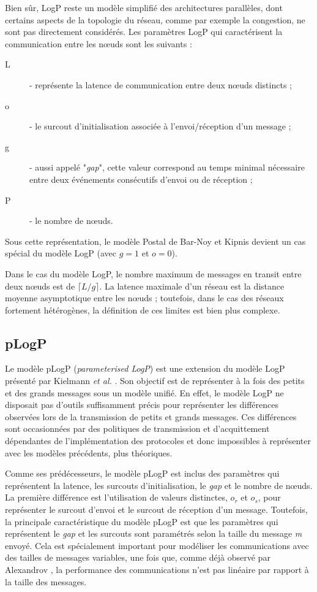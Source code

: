 Bien sûr, LogP reste un modèle simplifié des architectures parallèles,
dont certains aspects de la topologie du réseau, comme par exemple
la congestion, ne sont pas directement considérés. Les paramètres LogP qui caractérisent
la communication entre les n{\oe}uds sont les suivants : 

\begin{description}
\item [{L}] - représente la latence de communication entre deux n{\oe}uds
distincts ;
\item [{o}] - le surcout d'initialisation associée à l'envoi/réception
d'un message ;
\item [{g}] - aussi appelé "\textit{gap}", cette valeur correspond au temps minimal nécessaire entre deux événements consécutifs
d'envoi ou de réception ;
\item [{P}] - le nombre de n{\oe}uds.
\end{description}
Sous cette représentation, le modèle Postal de Bar-Noy et Kipnis devient
un cas spécial du modèle LogP (avec $g=1$ et $o=0$). 

Dans le cas du modèle LogP, le nombre maximum de messages en transit
entre deux n{\oe}uds est de $\lceil L/g\rceil$. La latence maximale
d'un réseau est la distance moyenne asymptotique entre les n{\oe}uds
; toutefois, dans le cas des réseaux fortement hétérogènes, la définition
de ces limites est bien plus complexe. 


\subsection*{pLogP}

Le modèle pLogP (\emph{parameterised LogP}) est une extension
du modèle LogP présenté par Kielmann \emph{et al.} \cite{Kielmann01}. Son objectif est de 
représenter à la fois des petits et des grands messages sous un modèle unifié. En effet, le modèle LogP ne disposait pas d'outils suffisamment précis pour représenter les différences observées lors de la transmission de petits et grands messages. Ces différences sont occasionnées par des politiques de transmission et d'acquittement dépendantes de l'implémentation des protocoles et donc impossibles à représenter avec les modèles précédents, plus théoriques.

Comme ses prédécesseurs, le modèle pLogP est inclus des
paramètres qui représentent la latence, les surcouts d'initialisation,
le \emph{gap} et le nombre de n{\oe}uds. La première différence est
l'utilisation de valeurs distinctes, $o_{r}$ et $o_{s}$, pour représenter
le surcout d'envoi et le surcout de réception d'un message. Toutefois,
la principale caractéristique du modèle pLogP est que les paramètres
qui représentent le \emph{gap} et les surcouts sont paramétrés selon
la taille du message \textit{m} envoyé. Cela est spécialement important pour
modéliser les communications avec des tailles de messages variables,
une fois que, comme déjà observé par Alexandrov \cite{Alexandrov95},
la performance des communications n'est pas linéaire par rapport à
la taille des messages.

